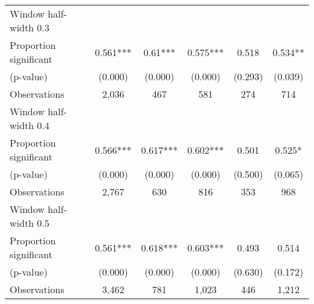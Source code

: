 \begin{tabular}{l*{5}{c}}
\hline
Window half-width 0.3\\

Proportion significant& 0.561*** &  0.61*** &  0.575*** &  0.518 &  0.534**\\

(p-value) & (0.000) &  (0.000) &  (0.000) &  (0.293) &  (0.039)\\

Observations& 2,036 &  467 &  581 &  274 &  714\\

\hline
Window half-width 0.4\\

Proportion significant& 0.566*** &  0.617*** &  0.602*** &  0.501 &  0.525*\\

(p-value) & (0.000) &  (0.000) &  (0.000) &  (0.500) &  (0.065)\\

Observations& 2,767 &  630 &  816 &  353 &  968\\

\hline
Window half-width 0.5\\

Proportion significant& 0.561*** &  0.618*** &  0.603*** &  0.493 &  0.514\\

(p-value) & (0.000) &  (0.000) &  (0.000) &  (0.630) &  (0.172)\\

Observations& 3,462 &  781 &  1,023 &  446 &  1,212\\

\hline\hline
\end{tabular}

